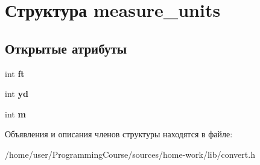 \hypertarget{structmeasure__units}{\section{Структура measure\+\_\+units}
\label{structmeasure__units}
}
\subsection*{Открытые атрибуты}
\begin{DoxyCompactItemize}
\item 
\hypertarget{structmeasure__units_a99d50ed991a42647bcc40cf9e848affb}{int {\bfseries ft}}\label{structmeasure__units_a99d50ed991a42647bcc40cf9e848affb}

\item 
\hypertarget{structmeasure__units_a130a0043a9b39f74d59a4d068c752a8c}{int {\bfseries yd}}\label{structmeasure__units_a130a0043a9b39f74d59a4d068c752a8c}

\item 
\hypertarget{structmeasure__units_af5dd807a9b0d0835701a5ddab53cd9ee}{int {\bfseries m}}\label{structmeasure__units_af5dd807a9b0d0835701a5ddab53cd9ee}

\end{DoxyCompactItemize}


Объявления и описания членов структуры находятся в файле\+:\begin{DoxyCompactItemize}
\item 
/home/user/\+Programming\+Course/sources/home-\/work/lib/convert.\+h\end{DoxyCompactItemize}
